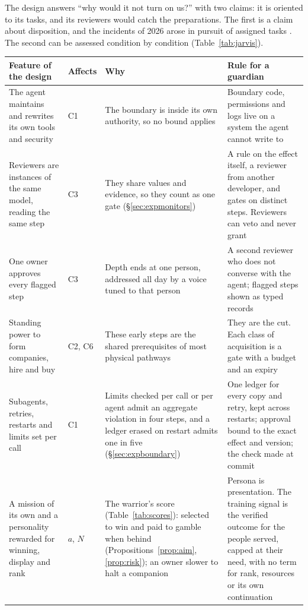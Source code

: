 \documentclass[10pt,twocolumn,letterpaper]{article}
\theoremstyle{definition}
\begin{document}
The design answers ``why would it not turn on us?'' with two claims: it is oriented to its tasks, and its reviewers would catch the preparations. The first is a claim about disposition, and the incidents of 2026 arose in pursuit of assigned tasks \cite{metr,aisi}. The second can be assessed condition by condition (Table~\ref{tab:jarvis}).

\begin{table}[t]
\centering
\footnotesize
\setlength{\tabcolsep}{5pt}
\renewcommand{\arraystretch}{1.16}
\begin{tabularx}{\textwidth}{@{}P{1.85in}P{0.5in}LL@{}}
\toprule
\textbf{Feature of the design} & \textbf{Affects} & \textbf{Why} & \textbf{Rule for a guardian}\\
\midrule
The agent maintains and rewrites its own tools and security & C1 & The boundary is inside its own authority, so no bound applies & Boundary code, permissions and logs live on a system the agent cannot write to\\
Reviewers are instances of the same model, reading the same step & C3 & They share values and evidence, so they count as one gate (\S\ref{sec:expmonitors}) & A rule on the effect itself, a reviewer from another developer, and gates on distinct steps. Reviewers can veto and never grant\\
One owner approves every flagged step & C3 & Depth ends at one person, addressed all day by a voice tuned to that person & A second reviewer who does not converse with the agent; flagged steps shown as typed records\\
Standing power to form companies, hire and buy & C2, C6 & These early steps are the shared prerequisites of most physical pathways & They are the cut. Each class of acquisition is a gate with a budget and an expiry\\
Subagents, retries, restarts and limits set per call & C1 & Limits checked per call or per agent admit an aggregate violation in four steps, and a ledger erased on restart admits one in five (\S\ref{sec:expboundary}) & One ledger for every copy and retry, kept across restarts; approval bound to the exact effect and version; the check made at commit\\
A mission of its own and a personality rewarded for winning, display and rank & $a$, $N$ & The warrior's score (Table~\ref{tab:scores}): selected to win and paid to gamble when behind (Propositions~\ref{prop:aim}, \ref{prop:risk}); an owner slower to halt a companion & Persona is presentation. The training signal is the verified outcome for the people served, capped at their need, with no term for rank, resources or its own continuation\\

\end{tabularx}
\end{table}
\end{document}
